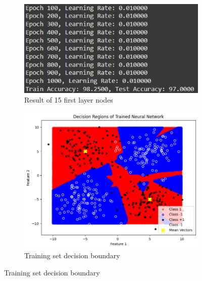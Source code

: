 \documentclass[a4paper,12pt]{article}
\begin{document}
\begin{figure}[H]
    \centering
    \captionsetup[subfigure]{list=true} %

    \begin{subfigure}{0.5\textwidth}
        \centering
        \includegraphics[width=\textwidth]{3.2_15_r.png}
        \caption{Result of 15 first layer nodes}
    \end{subfigure}
    \begin{subfigure}{0.45\textwidth}
        \centering
        \includegraphics[width=\textwidth]{3.2_15_Train.png}
        \caption{Training set decision boundary}
    \end{subfigure}


\end{figure}
\end{document}
